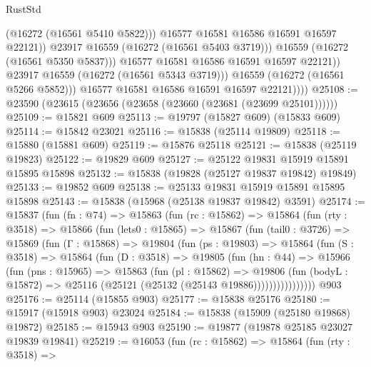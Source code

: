 \begin{lexlean}{RustStd}
\begin{coremodule}
                              (@16272 (@16561 @5410 @5822)))
                            @16577
                            @16581
                            @16586
                            @16591
                            @16597
                            @22121))
                        @23917
                        @16559
                        (@16272 (@16561 @5403 @3719)))
                      @16559
                      (@16272 (@16561 @5350 @5837)))
                    @16577
                    @16581
                    @16586
                    @16591
                    @16597
                    @22121))
                @23917
                @16559
                (@16272 (@16561 @5343 @3719)))
              @16559
              (@16272 (@16561 @5266 @5852)))
            @16577
            @16581
            @16586
            @16591
            @16597
            @22121))))
@25108 := @23590 (@23615 (@23656 (@23658 (@23660 (@23681 (@23699 @25101))))))
@25109 := @15821 @609
@25113 := @19797 (@15827 @609) (@15833 @609)
@25114 := @15842 @23021
@25116 := @15838 (@25114 @19809)
@25118 := @15880 (@15881 @609)
@25119 := @15876 @25118
@25121 := @15838 (@25119 @19823)
@25122 := @19829 @609
@25127 := @25122 @19831 @15919 @15891 @15895 @15898
@25132 := @15838 (@19828 (@25127 @19837 @19842) @19849)
@25133 := @19852 @609
@25138 := @25133 @19831 @15919 @15891 @15895 @15898
@25143 := @15838 (@15968 (@25138 @19837 @19842) @3591)
@25174 := @15837
    (fun (fn : @74) =>
    @15863
      (fun (rc : @15862) =>
      @15864
        (fun (rty : @3518) =>
        @15866
          (fun (lets0 : @15865) =>
          @15867
            (fun (tail0 : @3726) =>
            @15869
              (fun (Γ : @15868) =>
              @19804
                (fun (ps : @19803) =>
                @15864
                  (fun (S : @3518) =>
                  @15864
                    (fun (D : @3518) =>
                    @19805
                      (fun (hn : @44) =>
                      @15966
                        (fun (pns : @15965) =>
                        @15863
                          (fun (pl : @15862) =>
                          @19806
                            (fun (bodyL : @15872) =>
                            @25116 (@25121 (@25132 (@25143 @19886))))))))))))))))
    @903
@25176 := @25114 (@15855 @903)
@25177 := @15838 @25176
@25180 := @15917 (@15918 @903) @23024
@25184 := @15838 (@15909 (@25180 @19868) @19872)
@25185 := @15943 @903
@25190 := @19877 (@19878 @25185 @23027 @19839 @19841)
@25219 := @16053
    (fun (rc : @15862) =>
    @15864
      (fun (rty : @3518) =>

\end{coremodule}
\end{lexlean}
